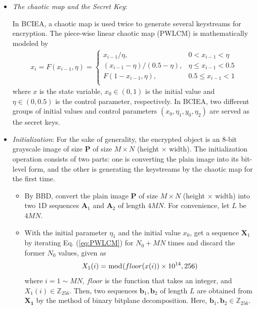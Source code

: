 \documentclass[final,3p,times]{elsarticle}
\begin{document}
\begin{itemize}
	
	\item \emph{The chaotic map and the Secret Key}:
	
	In BCIEA, a chaotic map is used twice to generate several keystreams for encryption. The piece-wise linear chaotic map (PWLCM) is mathematically modeled by
	\begin{equation}
	\begin{aligned}
	x_i = F(x_{i-1},\eta)=	\begin{cases}
	x_{i-1}/ \eta,              & 0<x_{i-1}<\eta \\
	(x_{i-1}- \eta)/(0.5-\eta), & \eta \le x_{i-1}<0.5 \\
	F(1-x_{i-1},\eta),          & 0.5 \le x_{i-1}<1 \\
	\end{cases}
	\end{aligned}
	\label{eq:PWLCM}
	\end{equation}
	where $x$ is the state variable, $x_0 \in (0,1)$ is the initial value and $\eta \in (0,0.5)$ is the control parameter, respectively. In BCIEA, two different groups of  initial values and control parameters $(x_0,\eta_1,y_0,\eta_2)$ are served as the secret keys.
	
	\item \emph{Initialization}:
	For the sake of generality, the encrypted object is an 8-bit grayscale image of size $\bm{P}$ of size $M \times N$ (height $\times$ width). The initialization operation consists of two parts: one is converting the plain image into its bit-level form, and the other is generating the keystreams by the chaotic map for the first time.
	\begin{itemize}
		\item By BBD, convert the plain image $\bm{P}$ of size $M \times N$ (height $\times$ width) into two 1D sequences $\bm{A}_1$ and $\bm{A}_2$ of length $4MN$. For convenience, let $L$ be $4MN$.
		\item With the initial parameter $\eta_1$ and the initial value $x_0$, get a sequence $\bm{X}_1$ by iterating Eq. (\ref{eq:PWLCM}) for $N_0+MN$ times and discard the former $N_0$ values, given as
		\begin{equation*}
		X_1(i) = \bmod(floor(x(i))\times 10^{14},256)\\
		\label{eq:PRNS}
		\end{equation*}
		where $i =1 \sim MN$, $floor$ is the function that takes an integer, and $X_1(i) \in \mathbb{Z}_{256}$. Then, two sequences $\bm{b}_1,\bm{b}_2$ of length $L$ are obtained from $\bm{X_1}$ by the method of binary bitplane decomposition. Here, $\bm{b}_1,\bm{b}_2 \in \mathbb{Z}_{256}$.
	\end{itemize}
	

\end{itemize}
\end{document}
